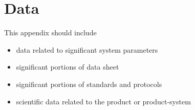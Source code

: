 
\chapter{Data}

This appendix should include
\begin{itemize}
\item data related to significant system parameters
\item significant portions of data sheet
\item significant portions of standards and protocols
\item scientific data related to the product or product-system
\end{itemize}

